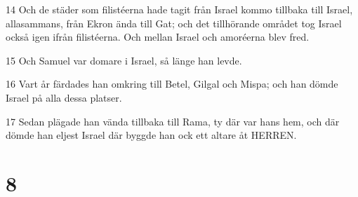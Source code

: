 \par 14 Och de städer som filistéerna hade tagit från Israel kommo tillbaka till Israel, allasammans, från Ekron ända till Gat; och det tillhörande området tog Israel också igen ifrån filistéerna. Och mellan Israel och amoréerna blev fred.
\par 15 Och Samuel var domare i Israel, så länge han levde.
\par 16 Vart år färdades han omkring till Betel, Gilgal och Mispa; och han dömde Israel på alla dessa platser.
\par 17 Sedan plägade han vända tillbaka till Rama, ty där var hans hem, och där dömde han eljest Israel där byggde han ock ett altare åt HERREN.

\chapter{8}


